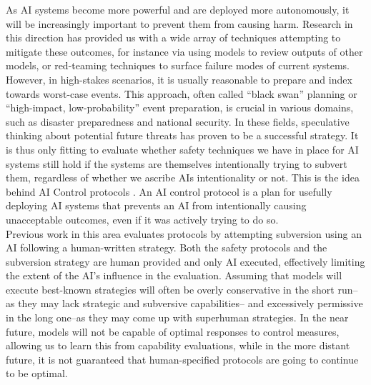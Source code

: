 As AI systems become more powerful and are deployed more autonomously, it will be increasingly important to prevent them from causing harm. Research in this direction has provided us with a wide array of techniques attempting to mitigate these outcomes, for instance via using models to review outputs of other models, or red-teaming techniques to surface failure modes of current systems. 
\\
However, in high-stakes scenarios, it is usually reasonable to prepare and index towards worst-case events. This approach, often called ``black swan'' planning or ``high-impact, low-probability'' event preparation, is crucial in various domains, such as disaster preparedness and national security. In these fields, speculative thinking about potential future threats has proven to be a successful strategy. It is thus only fitting to evaluate whether safety techniques we have in place for AI systems still hold if the systems are themselves intentionally trying to subvert them, regardless of whether we ascribe AIs intentionality or not. This is the idea behind AI Control protocols \citep{greenblatt2023ai}. An AI control protocol is a plan for usefully deploying AI systems that prevents an AI from intentionally causing unacceptable outcomes, even if it was actively trying to do so.
\\
Previous work in this area evaluates protocols by attempting subversion using an AI following a human-written strategy. Both the safety protocols and the subversion strategy are human provided and only AI executed, effectively limiting the extent of the AI’s influence in the evaluation. Assuming that models will execute best-known strategies will often be overly conservative in the short run--as they may lack strategic and subversive capabilities-- and excessively permissive in the long one--as they may come up with superhuman strategies. In the near future, models will not be capable of optimal responses to control measures, allowing us to learn this from capability evaluations, while in the more distant future, it is not guaranteed that human-specified protocols are going to continue to be optimal.
\\

